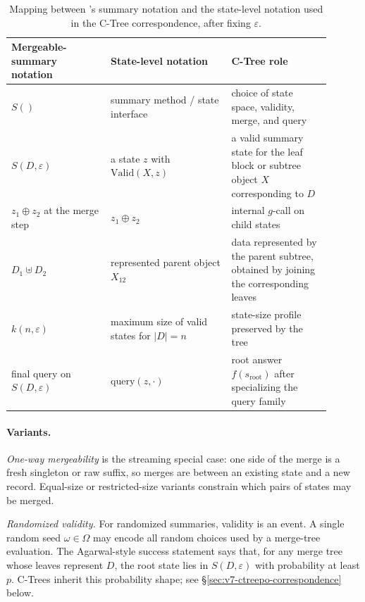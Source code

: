 \begin{table}[t]
\centering
\small
\setlength{\tabcolsep}{4pt}
\begin{tabular}{@{}p{0.28\linewidth}p{0.34\linewidth}p{0.28\linewidth}@{}}
\toprule
Mergeable-summary notation & State-level notation & C-Tree role \\
\midrule
\(S()\) & summary method / state interface & choice of state space, validity, merge, and query \\
\(S(D,\varepsilon)\) & a state \(z\) with
\(\mathrm{Valid}(X,z)\) & a valid summary state for the leaf block or
subtree object \(X\) corresponding to \(D\) \\
\(z_1\oplus z_2\) at the merge step & \(z_1\oplus z_2\) & internal \(g\)-call on child states \\
\(D_1\uplus D_2\) & represented parent object \(X_{12}\) & data represented by the parent subtree, obtained by joining the corresponding leaves \\
\(k(n,\varepsilon)\) & maximum size of valid states for \(|D|=n\) & state-size profile preserved by the tree \\
final query on \(S(D,\varepsilon)\) &
\(\mathrm{query}(z,\cdot)\) & root answer \(f(s_{\mathrm{root}})\) after specializing the query family \\
\bottomrule
\end{tabular}
\caption{Mapping between
\citet{Agarwal2013MergeableTODS}'s summary notation and the state-level
notation used in the C-Tree correspondence, after fixing
\(\varepsilon\).}
\label{tab:v7-agarwal-translation}
\end{table}

\paragraph{Variants.}
\emph{One-way mergeability} is the streaming special case: one side of
the merge is a fresh singleton or raw suffix, so merges are between an
existing state and a new record. Equal-size or restricted-size variants
constrain which pairs of states may be merged.

\emph{Randomized validity.} For randomized summaries, validity is an
event. A single random seed \(\omega\in\Omega\) may encode all random
choices used by a merge-tree evaluation. The Agarwal-style success
statement says that, for any merge tree whose leaves represent \(D\),
the root state lies in \(S(D,\varepsilon)\) with probability at least
\(p\). C-Trees inherit this probability shape; see
\S\ref{sec:v7-ctreepo-correspondence} below.

